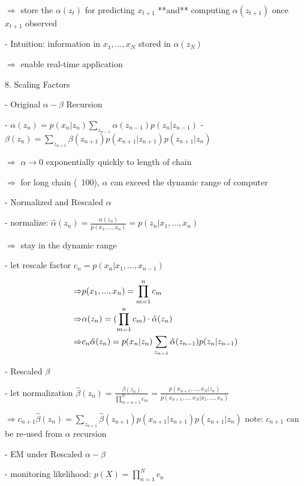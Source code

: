        $\Rightarrow$ store the $\alpha(z_t)$ for predicting $x_{t+1}$ **and** computing $\alpha(z_{t+1})$ once $x_{t+1}$ observed

     - Intuition: information in $x_1,...,x_N$ stored in $\alpha(z_N)$ 

       $\Rightarrow$ enable real-time application

8. Scaling Factors

   - Original $\alpha-\beta$ Recursion

     - $\displaystyle \alpha(z_n) =  p(x_n|z_n) \sum_{z_{n-1}}\alpha(z_{n-1}) p(z_n|z_{n-1})$
     - $\displaystyle \beta(z_n) =  \sum_{z_{n+1}} \beta(z_{n+1}) p(x_{n+1} | z_{n+1}) p(z_{n+1}|z_n)$ 

     $\Rightarrow$ $\alpha\rightarrow 0$ exponentially quickly to length of chain

     $\Rightarrow$ for long chain (~100), $\alpha$ can exceed the dynamic range of computer

   - Normalized and Rescaled $\alpha$ 

     - normalize: $\displaystyle \hat\alpha(z_n) = \frac{\alpha(z_n)} {p(x_1,...,x_n)} = p(z_n|x_1,...,x_n)$ 

       $\Rightarrow$ stay in the dynamic range

     - let rescale factor $c_n=p(x_n|x_1,...,x_{n-1})$ 

       \begin{align} \displaystyle \Rightarrow \space & p(x_1,...,x_n) = \prod_{m=1}^n c_m \\ \Rightarrow \space & \alpha(z_n) = (\prod_{m=1}^n c_m) \cdot \hat \alpha(z_n) \\ \Rightarrow \space & c_n\hat\alpha(z_n) = p(x_n|z_n)\sum_{z_{n-1}}\hat\alpha(z_{n-1})p(z_n|z_{n-1}) \end{align}

   - Rescaled $\beta$ 

     - let normalization $\displaystyle \hat\beta(z_n) = \frac {\beta(z_n)}{\displaystyle \prod_{m=n+1}^N c_m} = \frac{p(x_{n+1}, ..., x_N|z_n)}{p(x_{n+1}, ..., x_N|x_1,...,x_n)}$ 

       $\displaystyle \Rightarrow c_{n+1} \hat\beta (z_n) = \sum_{z_{n+1}} \hat\beta(z_{n+1}) p(x_{n+1}|z_{n+1})p(z_{n+1}|z_n)$ 
       note: $c_{n+1}$ can be re-used from $\alpha$ recursion

   - EM under Rescaled $\alpha-\beta$ 

     - monitoring likelihood: $\displaystyle p(X) = \prod_{n=1}^Nc_n$ 

